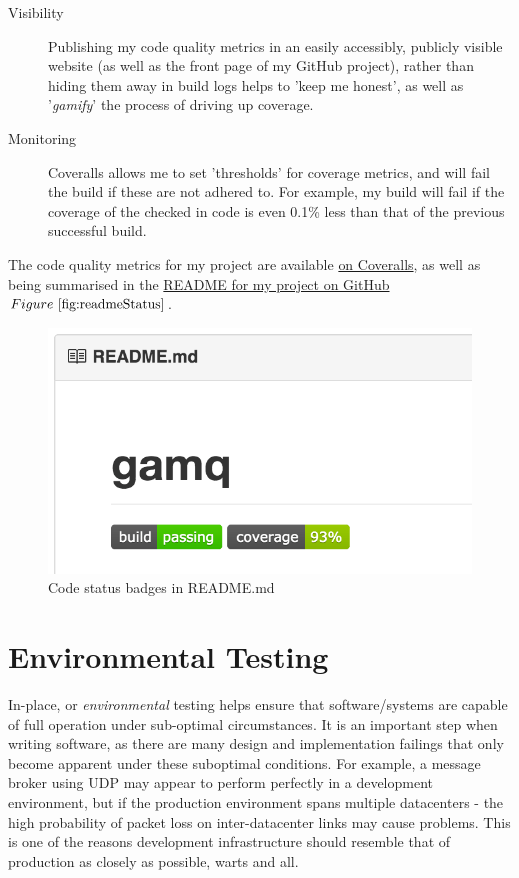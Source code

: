 \begin{description}
  \item[Visibility] Publishing my code quality metrics in an easily accessibly,
  publicly visible website (as well as the front page of my GitHub project),
  rather than hiding them away in build logs helps to 'keep me honest', as well
  as '\textit{\gls{gamify}}' the process of driving up coverage.
  \item[Monitoring] Coveralls allows me to set 'thresholds' for coverage
  metrics, and will fail the build if these are not adhered to. For example, my
  build will fail if the coverage of the checked in code is even 0.1\% less than
  that of the previous successful build.
\end{description}

The code quality metrics for my project are available
\href{https://coveralls.io/github/FireEater64/gamq?branch=master}{on Coveralls},
as well as being summarised in the
\href{https://github.com/FireEater64/gamq/blob/master/README.md}{README for my
project on GitHub}\(Figure~\ref{fig:readmeStatus} \).

\begin{figure}
  \includegraphics{figures/README}
  \centering
  \caption{Code status badges in README.md}
  \label{fig:readmeStatus}
\end{figure}

\section{Environmental Testing}
\label{sec:environmentalTesting}

In-place, or \emph{environmental} testing helps ensure that software/systems are
capable of full operation under sub-optimal circumstances. It is an important
step when writing software, as there are many design and implementation failings
that only become apparent under these suboptimal conditions. For example, a
message broker using UDP may appear to perform perfectly in a development
environment, but if the production environment spans multiple datacenters - the
high probability of packet loss on inter-datacenter links may cause problems.
This is one of the reasons development infrastructure should resemble that of
production as closely as possible, warts and all.

